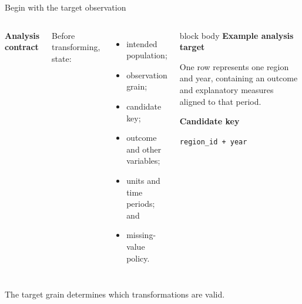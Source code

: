 \documentclass[10pt,aspectratio=169]{beamer}
\begin{document}
\begin{frame}{Begin with the target observation}

\small

\begin{columns}[T]


\textbf{Analysis contract}

Before transforming, state:

\begin{itemize}
  \item intended population;
  \item observation grain;
  \item candidate key;
  \item outcome and other variables;
  \item units and time periods; and
  \item missing-value policy.
\end{itemize}


\begin{beamercolorbox}[rounded=true,sep=8pt]{block body}
\textbf{Example analysis target}

\vspace{0.10cm}

One row represents one region and year, containing an outcome and explanatory measures aligned to that period.

\vspace{0.15cm}

\textbf{Candidate key}

\texttt{region\_id + year}
\end{beamercolorbox}

\end{columns}

\vspace{0.35cm}

\centering
\textcolor{ukudlaRed}{The target grain determines which transformations are valid.}

\end{frame}
\end{document}
